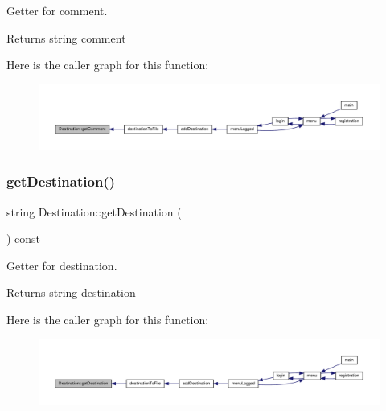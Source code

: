 Getter for comment. \begin{DoxyReturn}{Returns}
string comment 
\end{DoxyReturn}
Here is the caller graph for this function\+:\nopagebreak
\begin{figure}[H]
\begin{center}
\leavevmode
\includegraphics[width=350pt]{class_destination_a4d20ef4e561fa10dd81561b9cd61c55c_icgraph}
\end{center}
\end{figure}
\mbox{\label{class_destination_a6544fb0fa820f5a6b914a38cdcc949f9}} 
\subsubsection{\texorpdfstring{get\+Destination()}{getDestination()}}
{\footnotesize\ttfamily string Destination\+::get\+Destination (\begin{DoxyParamCaption}{ }\end{DoxyParamCaption}) const\hspace{0.3cm}{\ttfamily [inline]}}

Getter for destination. \begin{DoxyReturn}{Returns}
string destination 
\end{DoxyReturn}
Here is the caller graph for this function\+:\nopagebreak
\begin{figure}[H]
\begin{center}
\leavevmode
\includegraphics[width=350pt]{class_destination_a6544fb0fa820f5a6b914a38cdcc949f9_icgraph}
\end{center}
\end{figure}
\mbox{\label{class_destination_ac6265579620a20899f5e4cf817d037c8}} 
